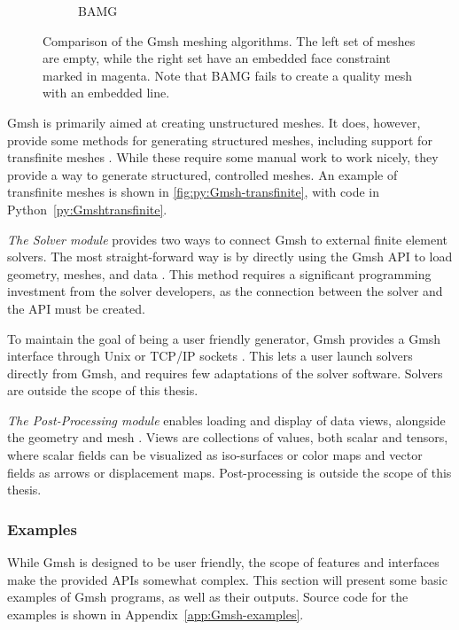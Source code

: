 \begin{figure}[p]
\begin{subfigure}[b]{\textwidth}
\begin{subfigure}[b]{0.32\textwidth}
        \end{subfigure}
        \caption{BAMG}
        \label{fig:Gmsh-BAMG}
    \end{subfigure}
    \caption[Comparison of the Gmsh meshing algorithms]{Comparison of the Gmsh meshing algorithms. The left set of meshes are empty, while the right set have an embedded face constraint marked in magenta. Note that BAMG fails to create a quality mesh with an embedded line.}
    \label{fig:Gmsh-meshing-algorithms}
\end{figure}

Gmsh is primarily aimed at creating unstructured meshes. It does, however, provide some methods for generating structured meshes, including support for transfinite meshes \cite{Gmsh_article}. While these require some manual work to work nicely, they provide a way to generate structured, controlled meshes. An example of transfinite meshes is shown in \autoref{fig:py:Gmsh-transfinite}, with code in Python~\ref{py:Gmshtransfinite}.

\emph{The Solver module} provides two ways to connect Gmsh to external finite element solvers. The most straight-forward way is by directly using the Gmsh API to load geometry, meshes, and data \cite{Gmsh_article}. This method requires a significant programming investment from the solver developers, as the connection between the solver and the API must be created.

To maintain the goal of being a user friendly generator, Gmsh provides a Gmsh interface through Unix or TCP/IP sockets \cite{Gmsh_article}. This lets a user launch solvers directly from Gmsh, and requires few adaptations of the solver software. Solvers are outside the scope of this thesis.

\emph{The Post-Processing module} enables loading and display of data views, alongside the geometry and mesh \cite{Gmsh_article}. Views are collections of values, both scalar and tensors, where scalar fields can be visualized as iso-surfaces or color maps and vector fields as arrows or displacement maps. Post-processing is outside the scope of this thesis. 


\subsubsection{Examples}
\label{sec:Gmsh-examples}
While Gmsh is designed to be user friendly, the scope of features and interfaces make the provided APIs somewhat complex. This section will present some basic examples of Gmsh programs, as well as their outputs. Source code for the examples is shown in Appendix~\ref{app:Gmsh-examples}.

